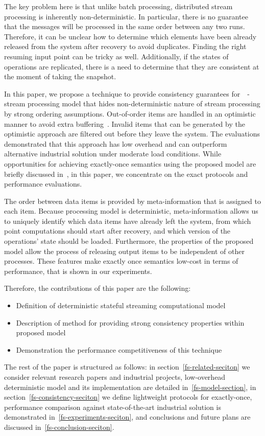 The key problem here is that unlike batch processing, distributed stream processing is inherently non-deterministic. In particular, there is no guarantee that the messages will be processed in the same order between any two runs. Therefore, it can be unclear how to determine which elements have been already released from the system after recovery to avoid duplicates. Finding the right resuming input point can be tricky as well. Additionally, if the states of operations are replicated, there is a need to determine that they are consistent at the moment of taking the snapshot. 

In this paper, we propose a technique to provide consistency guarantees for~\FlameStream\ - stream processing model that hides non-deterministic nature of stream processing by strong ordering assumptions. Out-of-order items are handled in an optimistic manner to avoid extra buffering~\cite{hiddenSeim}. Invalid items that can be generated by the optimistic approach are filtered out before they leave the system. The evaluations demonstrated that this approach has low overhead and can outperform alternative industrial solution under moderate load conditions. While opportunities for achieving exactly-once semantics using the proposed model are briefly discussed in~\cite{hiddenBeyondMR}, in this paper, we concentrate on the exact protocols and performance evaluations.

The order between data items is provided by meta-information that is assigned to each item. Because processing model is deterministic, meta-information allows us to uniquely identify which data items have already left the system, from which point computations should start after recovery, and which version of the operations' state should be loaded. Furthermore, the properties of the proposed model allow the process of releasing output items to be independent of other processes. These features make exactly once semantics low-cost in terms of performance, that is shown in our experiments. 

Therefore, the contributions of this paper are the following: 
\begin{itemize}
    \item Definition of deterministic stateful streaming computational model 
    \item Description of method for providing strong consistency properties within proposed model 
    \item Demonstration the performance competitiveness of this technique
\end{itemize}

The rest of the paper is structured as follows: in section~\ref{fs-related-seciton} we consider relevant research papers and industrial projects, low-overhead deterministic model and its implementation are detailed in~\ref{fs-model-section}, in section~\ref{fs-consistency-seciton} we define lightweight protocols for exactly-once, performance comparison against state-of-the-art industrial solution is demonstrated in~\ref{fs-experiments-seciton}, and conclusions and future plans are discussed in~\ref{fs-conclusion-seciton}.

